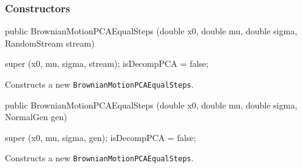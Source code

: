 \subsubsection* {Constructors}
\begin{code}

    public BrownianMotionPCAEqualSteps (double x0, double mu, double sigma,
                              RandomStream stream) \begin{hide} {
        super (x0, mu, sigma, stream);
        isDecompPCA = false;
    }\end{hide}
\end{code}
\begin{tabb} Constructs a new \texttt{BrownianMotionPCAEqualSteps}.
\end{tabb}
\begin{code}

    public BrownianMotionPCAEqualSteps (double x0, double mu, double sigma,
                              NormalGen gen) \begin{hide} {
        super (x0, mu, sigma, gen);
        isDecompPCA = false;
    }\end{hide}
\end{code}
\begin{tabb} Constructs a new \texttt{BrownianMotionPCAEqualSteps}.
\end{tabb}

